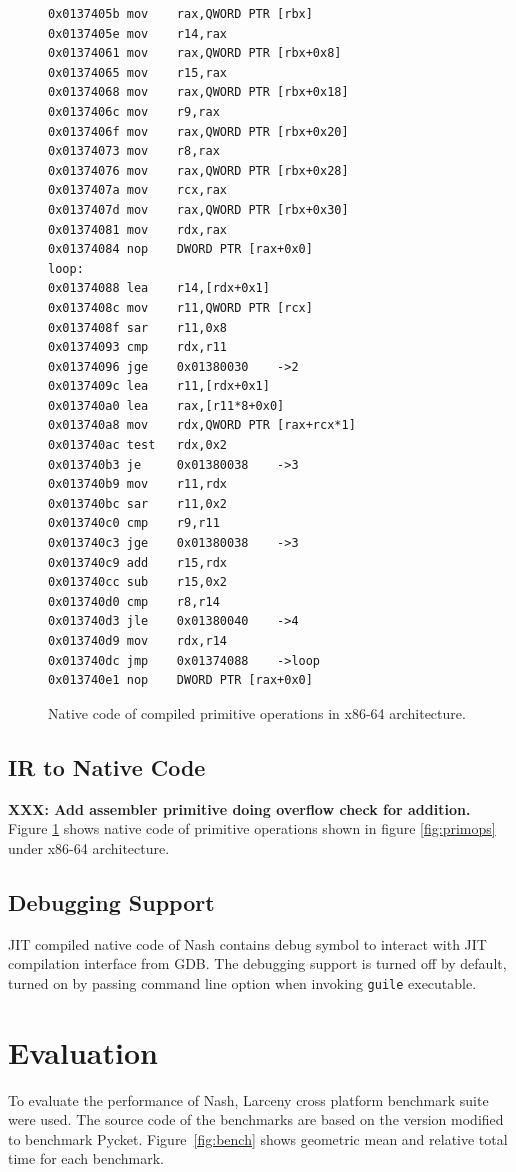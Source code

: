 \documentclass[preprint, numbers]{sigplanconf}
\begin{document}
\begin{figure}
  \centering
\begin{verbatim}
0x0137405b mov    rax,QWORD PTR [rbx]
0x0137405e mov    r14,rax
0x01374061 mov    rax,QWORD PTR [rbx+0x8]
0x01374065 mov    r15,rax
0x01374068 mov    rax,QWORD PTR [rbx+0x18]
0x0137406c mov    r9,rax
0x0137406f mov    rax,QWORD PTR [rbx+0x20]
0x01374073 mov    r8,rax
0x01374076 mov    rax,QWORD PTR [rbx+0x28]
0x0137407a mov    rcx,rax
0x0137407d mov    rax,QWORD PTR [rbx+0x30]
0x01374081 mov    rdx,rax
0x01374084 nop    DWORD PTR [rax+0x0]
loop:
0x01374088 lea    r14,[rdx+0x1]
0x0137408c mov    r11,QWORD PTR [rcx]
0x0137408f sar    r11,0x8
0x01374093 cmp    rdx,r11
0x01374096 jge    0x01380030    ->2
0x0137409c lea    r11,[rdx+0x1]
0x013740a0 lea    rax,[r11*8+0x0]
0x013740a8 mov    rdx,QWORD PTR [rax+rcx*1]
0x013740ac test   rdx,0x2
0x013740b3 je     0x01380038    ->3
0x013740b9 mov    r11,rdx
0x013740bc sar    r11,0x2
0x013740c0 cmp    r9,r11
0x013740c3 jge    0x01380038    ->3
0x013740c9 add    r15,rdx
0x013740cc sub    r15,0x2
0x013740d0 cmp    r8,r14
0x013740d3 jle    0x01380040    ->4
0x013740d9 mov    rdx,r14
0x013740dc jmp    0x01374088    ->loop
0x013740e1 nop    DWORD PTR [rax+0x0]
\end{verbatim}
\caption{Native code of compiled primitive operations in x86-64 architecture.}
\label{fig:native}
\end{figure}

\subsection{IR to Native Code}
\textbf{XXX: Add assembler primitive doing overflow check for addition.}
Figure \hyperref[fig:native]{\ref{fig:native}} shows native code of primitive
operations shown in figure \hyperref[fig:primops]{\ref{fig:primops}} under
x86-64 architecture.

\subsection{Debugging Support}

JIT compiled native code of Nash contains debug symbol to interact with JIT
compilation interface from GDB\cite{gdbdebugger}. The debugging support is
turned off by default, turned on by passing command line option when invoking
\texttt{guile} executable.

\section{Evaluation}
\label{sec:evaluation}
To evaluate the performance of Nash, Larceny cross platform benchmark suite
were used. The source code of the benchmarks are based on the version modified
to benchmark Pycket. Figure~\ref{fig:bench} shows geometric mean and
relative total time for each benchmark.
\end{document}
